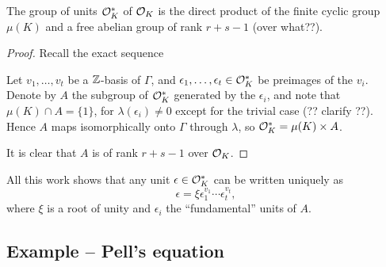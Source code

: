 \begin{thm}
	The group of units $\mathcal{O}^*_K$ of $\mathcal{O}_K$ is the direct product of the finite cyclic group $\mu(K)$ and a free abelian group of rank $r+s-1$ (over what??).
\end{thm}
\begin{proof}
	Recall the exact sequence
	\begin{center}
	\end{center}
	Let $v_1,\dots,v_t$ be a $\mathbb{Z}$-basis of $\Gamma$, and $\epsilon_1,\dots,\epsilon_t\in\mathcal{O}^*_K$ be preimages of the $v_i$. Denote by $A$ the subgroup of $\mathcal{O}^*_K$ generated by the $\epsilon_i$, and note that $\mu(K)\cap A=\{1\}$, for $\lambda(\epsilon_i)\neq 0$ except for the trivial case (?? clarify ??). Hence $A$ maps isomorphically onto $\Gamma$ through $\lambda$, so $\mathcal{O}^*_K=\mu(K)\times A$.

	It is clear that $A$ is of rank $r+s-1$ over $\mathcal{O}_K$.

\end{proof}

All this work shows that any unit $\epsilon\in\mathcal{O}^*_K$ can be written uniquely as
\[
	\epsilon = \xi \epsilon_1^{v_1}\cdots\epsilon_t^{v_t},
\]
where $\xi$ is a root of unity and $\epsilon_i$ the ``fundamental'' units of $A$.


\subsection{Example -- Pell's equation}

